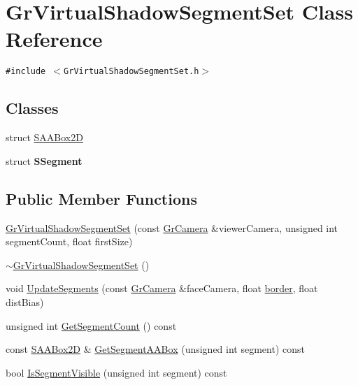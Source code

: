 \hypertarget{class_gr_virtual_shadow_segment_set}{
\section{GrVirtualShadowSegmentSet Class Reference}
\label{class_gr_virtual_shadow_segment_set}
}
{\tt \#include $<$GrVirtualShadowSegmentSet.h$>$}

\subsection*{Classes}
\begin{CompactItemize}
\item 
struct \hyperlink{struct_gr_virtual_shadow_segment_set_1_1_s_a_a_box2_d}{SAABox2D}
\item 
struct \textbf{SSegment}
\end{CompactItemize}
\subsection*{Public Member Functions}
\begin{CompactItemize}
\item 
\hyperlink{class_gr_virtual_shadow_segment_set_82e00df096614e8665e53a50555a2b8a}{GrVirtualShadowSegmentSet} (const \hyperlink{class_gr_camera}{GrCamera} \&viewerCamera, unsigned int segmentCount, float firstSize)
\item 
\hyperlink{class_gr_virtual_shadow_segment_set_e91a62dfaca674a03d9a66a4df3d7f23}{$\sim$GrVirtualShadowSegmentSet} ()
\item 
void \hyperlink{class_gr_virtual_shadow_segment_set_92e15d9d6393687920a408901ba53cd2}{UpdateSegments} (const \hyperlink{class_gr_camera}{GrCamera} \&faceCamera, float \hyperlink{glext__bak_8h_6180492a53d6843c599d9934a5facf65}{border}, float distBias)
\item 
unsigned int \hyperlink{class_gr_virtual_shadow_segment_set_2289656379ca28ba3c9927dde5e5db39}{GetSegmentCount} () const 
\item 
const \hyperlink{struct_gr_virtual_shadow_segment_set_1_1_s_a_a_box2_d}{SAABox2D} \& \hyperlink{class_gr_virtual_shadow_segment_set_25b9adc6e79330f077e34c834521a16d}{GetSegmentAABox} (unsigned int segment) const 
\item 
bool \hyperlink{class_gr_virtual_shadow_segment_set_2ba9048945a0a60bb9cb59f3e8796887}{IsSegmentVisible} (unsigned int segment) const 
\end{CompactItemize}


